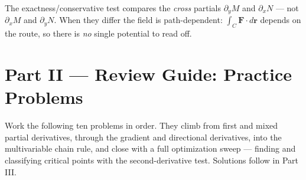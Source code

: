 \begin{warningbox}
The exactness/conservative test compares the \emph{cross} partials
$\partial_y M$ and $\partial_x N$ --- not $\partial_x M$ and $\partial_y N$. When
they differ the field is path-dependent: $\int_C\mathbf F\cdot d\mathbf r$
depends on the route, so there is \emph{no} single potential to read off.
\end{warningbox}

\clearpage
{}
{}
\section*{Part II --- Review Guide: Practice Problems}

Work the following ten problems in order. They climb from first and mixed partial
derivatives, through the gradient and directional derivatives, into the
multivariable chain rule, and close with a full optimization sweep --- finding
and classifying critical points with the second-derivative test. Solutions follow
in Part III.

